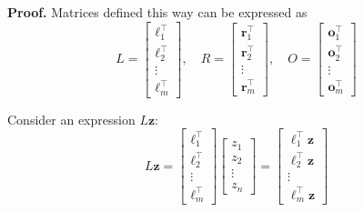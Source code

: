\documentclass[../lecture-notes-148x210.tex]{subfiles}
\begin{document}
\textbf{Proof.} Matrices defined this way can be expressed as
\begin{equation*}
    L = \begin{bmatrix}
        \boldsymbol{\ell}_1^{\top} \\ \boldsymbol{\ell}_2^{\top} \\ \vdots \\ \boldsymbol{\ell}_m^{\top}
    \end{bmatrix}, \quad R = \begin{bmatrix}
        \boldsymbol{r}_1^{\top} \\ \boldsymbol{r}_2^{\top} \\ \vdots \\ \boldsymbol{r}_m^{\top}
    \end{bmatrix}, \quad O = \begin{bmatrix}
        \boldsymbol{o}_1^{\top} \\ \boldsymbol{o}_2^{\top} \\ \vdots \\ \boldsymbol{o}_m^{\top}
    \end{bmatrix}
\end{equation*}

Consider an expression $L\mathbf{z}$:
\begin{equation*}
    L\mathbf{z} = \begin{bmatrix}
        \boldsymbol{\ell}_1^{\top} \\ \boldsymbol{\ell}_2^{\top} \\ \vdots \\ \boldsymbol{\ell}_m^{\top}
    \end{bmatrix}\begin{bmatrix}
        z_1 \\ z_2 \\ \vdots \\ z_n
    \end{bmatrix} = \begin{bmatrix}
        \boldsymbol{\ell}_1^{\top}\mathbf{z} \\ \boldsymbol{\ell}_2^{\top}\mathbf{z} \\ \vdots \\ \boldsymbol{\ell}_m^{\top}\mathbf{z}
    \end{bmatrix}
\end{equation*}
\end{document}
